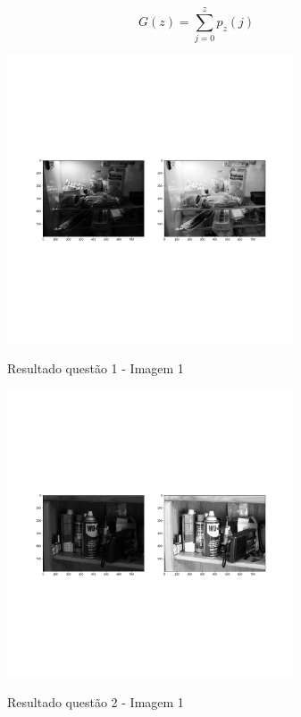 \documentclass{article}
\begin{document}
\begin{equation}
\label{eq:cdf_pz}
G(z) = \sum_{j = 0}^{z} p_z(j)
\end{equation}

\begin{figure}[H]
	\label{fig: q1_1}
	\begin{minipage}[b]{1.0\linewidth}
		\centering
		\centerline{\includegraphics[width=8.5cm]{Figures/result1_1}}
		\centerline{Resultado questão 1 - Imagem 1}\medskip	
	\end{minipage}
\end{figure}

\begin{figure}[H]
	\label{fig: q1_2}
	\begin{minipage}[b]{1.0\linewidth}
		\centering
		\centerline{\includegraphics[width=8.5cm]{Figures/result1_2}}
		\centerline{Resultado questão 2 - Imagem 1}\medskip	
	\end{minipage}
\end{figure}
\end{document}
